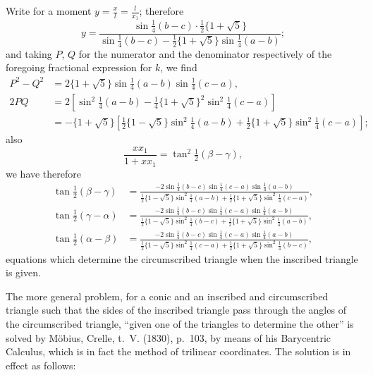 \documentclass[11pt,a4paper]{article}
\theoremstyle{plain}
\begin{document}
Write for a moment $y = \frac{x}{l} = \frac{l}{x_1}$; therefore
\[
y = \frac{\sin\tfrac{1}{4}(b - c)\cdot\tfrac{1}{2}\{1 + \sqrt{5}\}}{\sin\tfrac{1}{4}(b - c) - \tfrac{1}{2}\{1 + \sqrt{5}\}\sin\tfrac{1}{4}(a - b)};
\]
and taking $P$, $Q$ for the numerator and the denominator respectively of the foregoing fractional expression for $k$, we find
\begin{align*}
P^2 - Q^2 &= 2\{1 + \sqrt{5}\}\sin\tfrac{1}{4}(a - b)\sin\tfrac{1}{4}(c - a),\\
2PQ &= 2\left[\sin^2\tfrac{1}{4}(a - b) - \tfrac{1}{4}\{1 + \sqrt{5}\}^2\sin^2\tfrac{1}{4}(c - a)\right]\\
&= -\{1 + \sqrt{5}\}\left[\tfrac{1}{2}\{1 - \sqrt{5}\}\sin^2\tfrac{1}{4}(a - b) + \tfrac{1}{2}\{1 + \sqrt{5}\}\sin^2\tfrac{1}{4}(c - a)\right];
\end{align*}
also
\[
\frac{xx_1}{1 + xx_1} = \tan^2\tfrac{1}{2}(\beta - \gamma),
\]
we have therefore
\begin{align*}
\tan\tfrac{1}{2}(\beta - \gamma) &= \frac{-2\sin\tfrac{1}{4}(b - c)\sin\tfrac{1}{4}(c - a)\sin\tfrac{1}{4}(a - b)}{\tfrac{1}{2}\{1 - \sqrt{5}\}\sin^2\tfrac{1}{4}(a - b) + \tfrac{1}{2}\{1 + \sqrt{5}\}\sin^2\tfrac{1}{4}(c - a)},\\
\tan\tfrac{1}{2}(\gamma - \alpha) &= \frac{-2\sin\tfrac{1}{4}(b - c)\sin\tfrac{1}{4}(c - a)\sin\tfrac{1}{4}(a - b)}{\tfrac{1}{2}\{1 - \sqrt{5}\}\sin^2\tfrac{1}{4}(b - c) + \tfrac{1}{2}\{1 + \sqrt{5}\}\sin^2\tfrac{1}{4}(a - b)},\\
\tan\tfrac{1}{2}(\alpha - \beta) &= \frac{-2\sin\tfrac{1}{4}(b - c)\sin\tfrac{1}{4}(c - a)\sin\tfrac{1}{4}(a - b)}{\tfrac{1}{2}\{1 - \sqrt{5}\}\sin^2\tfrac{1}{4}(c - a) + \tfrac{1}{2}\{1 + \sqrt{5}\}\sin^2\tfrac{1}{4}(b - c)},
\end{align*}
equations which determine the circumscribed triangle when the inscribed triangle is given.

The more general problem, for a conic and an inscribed and circumscribed triangle such that the sides of the inscribed triangle pass through the angles of the circumscribed triangle, ``given one of the triangles to determine the other'' is solved by M\"{o}bius, Crelle, t.~V. (1830), p.~103, by means of his Barycentric Calculus, which is in fact the method of trilinear coordinates. The solution is in effect as follows:
\end{document}
